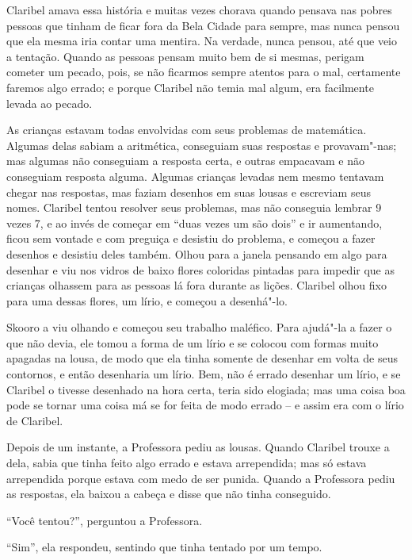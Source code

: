 Claribel amava essa história e muitas vezes chorava quando pensava nas
pobres pessoas que tinham de ficar fora da Bela Cidade para sempre, mas
nunca pensou que ela mesma iria contar uma mentira. Na verdade,
nunca pensou, até que veio a tentação. Quando as pessoas pensam muito
bem de si mesmas, perigam cometer um pecado, pois, se não ficarmos
sempre atentos para o mal, certamente faremos algo errado; e porque
Claribel não temia mal algum, era facilmente levada ao pecado.

As crianças estavam todas envolvidas com seus problemas de matemática. Algumas
delas sabiam a aritmética, conseguiam suas respostas e provavam"-nas; mas
algumas não conseguiam a resposta certa, e outras empacavam e não
conseguiam resposta alguma. Algumas crianças levadas nem mesmo tentavam
chegar nas respostas, mas faziam desenhos em suas lousas e escreviam
seus nomes. Claribel tentou resolver seus problemas, mas não
conseguia lembrar 9 vezes 7, e ao invés de começar em ``duas vezes um
são dois'' e ir aumentando, ficou sem vontade e com preguiça e
desistiu do problema, e começou a fazer desenhos e desistiu deles também.
Olhou para a janela pensando em algo para desenhar e viu nos vidros
de baixo flores coloridas pintadas para impedir que as crianças olhassem
para as pessoas lá fora durante as lições. Claribel olhou fixo para uma
dessas flores, um lírio, e começou a desenhá"-lo.



Skooro a viu olhando e começou seu trabalho maléfico. Para ajudá"-la a
fazer o que não devia, ele tomou a forma de um lírio e se colocou com
formas muito apagadas na lousa, de modo que ela tinha somente de desenhar
em volta de seus contornos, e então desenharia um lírio. Bem, não
é errado desenhar um lírio, e se Claribel o tivesse desenhado na hora
certa, teria sido elogiada; mas uma coisa boa pode se tornar uma
coisa má se for feita de modo errado -- e assim era com o lírio de
Claribel.


Depois de um instante, a Professora pediu as lousas. Quando Claribel
trouxe a dela, sabia que tinha feito algo errado e estava arrependida; mas só
estava arrependida porque estava com medo de ser punida. Quando a
Professora pediu as respostas, ela baixou a cabeça e disse que não
tinha conseguido.


``Você tentou?'', perguntou a Professora.

``Sim'', ela respondeu, sentindo que tinha tentado por um tempo.

